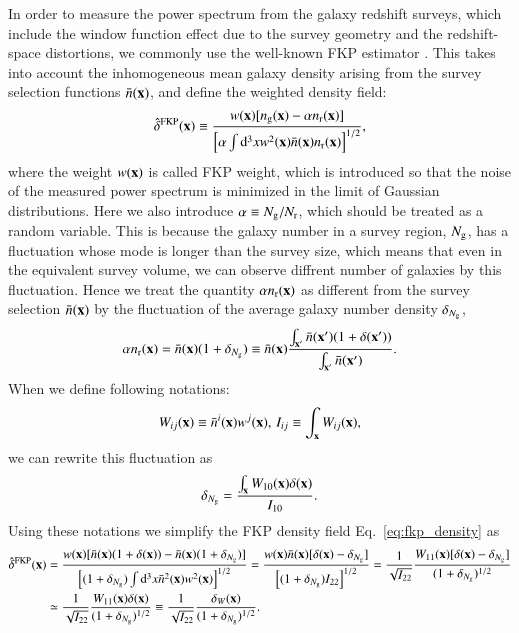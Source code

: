 \documentclass[onecolumn,showpacs,amsmath,amssymb,prd,floatfix,preprintnumbers]{revtex4}
\newcommand{\bx}{{\bf x}}
\begin{document}
In order to measure the power spectrum from the galaxy redshift surveys, which include the window function effect due to the survey geometry and the redshift-space distortions, we commonly use the well-known FKP estimator \cite{feldman94}. 
This takes into account the inhomogeneous mean galaxy density arising from the survey selection functions $\bar{n}(\bx)$, 
and define the weighted density field:
\begin{align}
\label{eq:fkp_density}
 \hat{\delta}^{\rm FKP}(\bx) \equiv \frac{w(\bx) [n_{\rm g}(\bx) - \alpha n_{\rm r}(\bx)]}{\left[ \alpha \int {\rm d}^3x w^2(\bx) \bar{n}(\bx) n_{\rm r}(\bx) \right]^{1/2}},
\end{align}
where the weight $w(\bx)$ is called FKP weight, which is introduced so that the noise of the measured power spectrum is minimized in the limit of Gaussian distributions.
Here we also introduce $\alpha \equiv N_{\rm g} / N_{\rm r}$, which should be treated as a random variable.
This is because the galaxy number in a survey region, $N_{\rm g}$, has a fluctuation whose mode is longer than the survey size, which means that even in the equivalent survey volume, we can observe diffrent number of galaxies by this fluctuation.
Hence we treat the quantity $\alpha n_{\rm r}(\bx)$ as different from the survey selection $\bar{n}(\bx)$ by the fluctuation of the average galaxy number density $\delta_{N_{\rm g}}$,
\begin{align}
  \alpha n_{\rm r}(\bx) = \bar{n}(\bx) (1 + \delta_{N_{\rm g}}) \equiv \bar{n}(\bx) \frac{\int_{\bx'} \bar{n}(\bx') (1+\delta(\bx'))}{\int_{\bx'} \bar{n}(\bx')}.
\end{align}
When we define following notations:
\begin{align}
  W_{ij}(\bx) \equiv \bar{n}^i(\bx) w^j(\bx),\,I_{ij} \equiv \int_{\bx} W_{ij}(\bx),
\end{align}
we can rewrite this fluctuation as
\begin{align}
  \delta_{N_{\rm g}} = \frac{\int_{\bx} W_{10}(\bx) \delta(\bx)}{I_{10}}. 
\end{align}
Using these notations we simplify the FKP density field Eq.~\ref{eq:fkp_density} as
\begin{align}
  \hat{\delta}^{\rm FKP}(\bx) &= \frac{w(\bx) [\bar{n}(\bx) (1 + \delta(\bx)) - \bar{n}(\bx) (1 + \delta_{N_{\rm g}}) ]}{\left[ (1 + \delta_{N_{\rm g}}) \int {\rm d}^3x \bar{n}^2(\bx) w^2(\bx) \right]^{1/2}}
  = \frac{w(\bx) \bar{n}(\bx) [\delta(\bx) - \delta_{N_{\rm g}} ]}{\left[ (1 + \delta_{N_{\rm g}}) I_{22} \right]^{1/2}}
  = \frac{1}{\sqrt{I_{22}}} \frac{W_{11}(\bx) [\delta(\bx) - \delta_{N_{\rm g}} ]}{(1 + \delta_{N_{\rm g}})^{1/2}} \\
  &\simeq \frac{1}{\sqrt{I_{22}}} \frac{W_{11}(\bx)\delta(\bx)}{(1 + \delta_{N_{\rm g}})^{1/2}}
  \equiv \frac{1}{\sqrt{I_{22}}} \frac{\delta_W(\bx)}{(1 + \delta_{N_{\rm g}})^{1/2}}.
\end{align}
\end{document}
